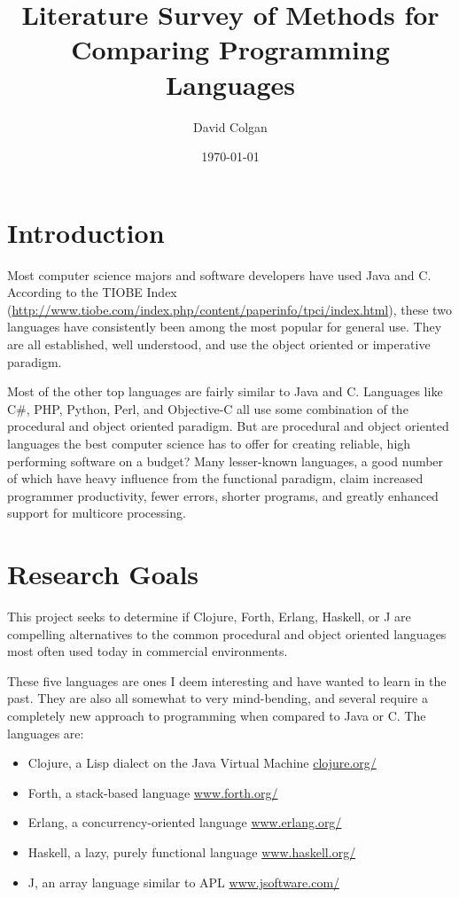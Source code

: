 \documentclass{article}
\title{Literature Survey of Methods for Comparing Programming Languages}
\author{David Colgan}
\date{\today}
\begin{document}
\maketitle

\section{Introduction}

Most computer science majors and software developers have used Java and C.
According to the TIOBE Index
(\url{http://www.tiobe.com/index.php/content/paperinfo/tpci/index.html}), these
two languages have consistently been among the most popular for general use.
They are all established, well understood, and use the object oriented or
imperative paradigm.

Most of the other top languages are fairly similar to Java and C.  Languages
like C\#, PHP, Python, Perl, and Objective-C all use some combination of the
procedural and object oriented paradigm.   But are procedural and object
oriented languages the best computer science has to offer for creating reliable,
high performing software on a budget?  Many lesser-known languages, a good
number of which have heavy influence from the functional paradigm, claim
increased programmer productivity, fewer errors, shorter programs, and greatly
enhanced support for multicore processing.

\section{Research Goals}

This project seeks to determine if Clojure, Forth, Erlang, Haskell, or J are
compelling alternatives to the common procedural and object oriented languages
most often used today in commercial environments.

These five languages are ones I deem interesting and have wanted to learn in
the past.  They are also all somewhat to very mind-bending, and several require
a completely new approach to programming when compared to Java or C.  The
languages are:

\begin{itemize}
\item Clojure, a Lisp dialect on the Java Virtual Machine
\url{clojure.org/}

\item Forth, a stack-based language
\url{www.forth.org/}

\item Erlang, a concurrency-oriented language
\url{www.erlang.org/}

\item Haskell, a lazy, purely functional language
\url{www.haskell.org/}

\item J, an array language similar to APL
\url{www.jsoftware.com/}
\end{itemize}
\end{document}
